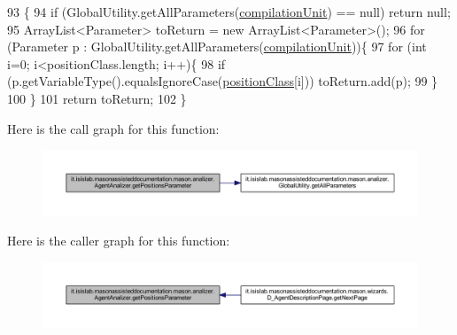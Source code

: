 \begin{DoxyCode}
93                                                        \{
94         \textcolor{keywordflow}{if} (GlobalUtility.getAllParameters(\hyperlink{classit_1_1isislab_1_1masonassisteddocumentation_1_1mason_1_1analizer_1_1_agent_analizer_aad9b5d0882694d2802dc24c982f21985}{compilationUnit}) == null) \textcolor{keywordflow}{return} null;
95         ArrayList<Parameter> toReturn = \textcolor{keyword}{new} ArrayList<Parameter>();
96         \textcolor{keywordflow}{for} (Parameter p : GlobalUtility.getAllParameters(\hyperlink{classit_1_1isislab_1_1masonassisteddocumentation_1_1mason_1_1analizer_1_1_agent_analizer_aad9b5d0882694d2802dc24c982f21985}{compilationUnit}))\{
97                 \textcolor{keywordflow}{for} (\textcolor{keywordtype}{int} i=0; i<positionClass.length; i++)\{
98                     \textcolor{keywordflow}{if} (p.getVariableType().equalsIgnoreCase(\hyperlink{classit_1_1isislab_1_1masonassisteddocumentation_1_1mason_1_1analizer_1_1_agent_analizer_aea5eff658e91428950dd0efd1339bf36}{positionClass}[i]))    
      toReturn.add(p);
99                 \}               
100         \}
101         \textcolor{keywordflow}{return} toReturn;
102     \}   
\end{DoxyCode}


Here is the call graph for this function\-:
\nopagebreak
\begin{figure}[H]
\begin{center}
\leavevmode
\includegraphics[width=350pt]{classit_1_1isislab_1_1masonassisteddocumentation_1_1mason_1_1analizer_1_1_agent_analizer_a351c38491d7f706177c4c76478cabd6d_cgraph}
\end{center}
\end{figure}




Here is the caller graph for this function\-:
\nopagebreak
\begin{figure}[H]
\begin{center}
\leavevmode
\includegraphics[width=350pt]{classit_1_1isislab_1_1masonassisteddocumentation_1_1mason_1_1analizer_1_1_agent_analizer_a351c38491d7f706177c4c76478cabd6d_icgraph}
\end{center}
\end{figure}


